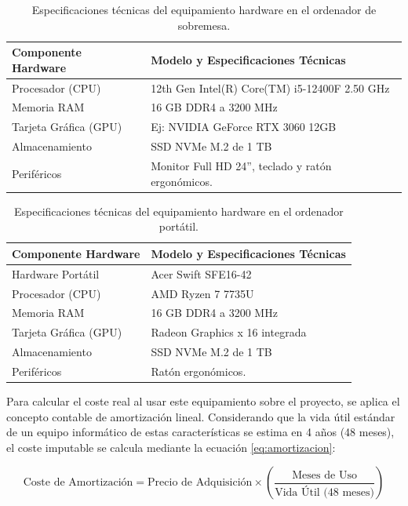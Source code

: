 \documentclass[12pt,a4paper,onecolumn,oneside]{report}
\begin{document}
\begin{table}[htbp]
\centering
\small
\begin{tabular}{|l|l|}
\hline
\textbf{Componente Hardware} & \textbf{Modelo y Especificaciones Técnicas} \\ \hline
Procesador (CPU) & 12th Gen Intel(R) Core(TM) i5-12400F   2.50 GHz \\ \hline
Memoria RAM & 16 GB DDR4 a 3200 MHz \\ \hline
Tarjeta Gráfica (GPU) & Ej: NVIDIA GeForce RTX 3060 12GB \\ \hline
Almacenamiento & SSD NVMe M.2 de 1 TB \\ \hline
Periféricos & Monitor Full HD 24'', teclado y ratón ergonómicos. \\ \hline
\end{tabular}
\caption{Especificaciones técnicas del equipamiento hardware en el ordenador de sobremesa.}
\label{tab:especificaciones_hardware_sobremesa}
\end{table}

\begin{table}[htbp]
\centering
\small
\begin{tabular}{|l|p{}|}
\hline
\textbf{Componente Hardware} & \textbf{Modelo y Especificaciones Técnicas} \\ \hline
Hardware Portátil & Acer Swift SFE16-42 \\ \hline
Procesador (CPU) & AMD Ryzen 7 7735U \\\hline
Memoria RAM & 16 GB DDR4 a 3200 MHz \\ \hline
Tarjeta Gráfica (GPU) & Radeon Graphics x 16 integrada \\ \hline
Almacenamiento & SSD NVMe M.2 de 1 TB \\ \hline
Periféricos & Ratón ergonómicos. \\ \hline
\end{tabular}
\caption{Especificaciones técnicas del equipamiento hardware en el ordenador portátil.}
\label{tab:especificaciones_hardware_portatil}
\end{table}


Para calcular el coste real al usar este equipamiento sobre el proyecto, se aplica el concepto contable de amortización lineal. Considerando que la vida útil estándar de un equipo informático de estas características se estima en 4 años (48 meses), el coste imputable se calcula mediante la ecuación \ref{eq:amortizacion}:

\begin{equation}
\text{Coste de Amortización} = \text{Precio de Adquisición} \times \left( \frac{\text{Meses de Uso}}{\text{Vida Útil (48 meses)}} \right)
\label{eq:amortizacion}
\end{equation}
\end{document}
